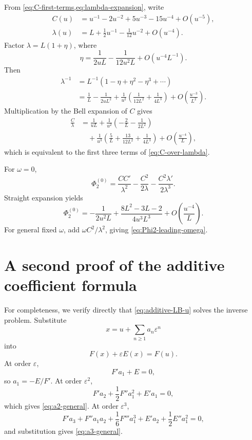 \documentclass[11pt]{article}
\numberwithin{equation}{section}
\theoremstyle{mainthm}
\theoremstyle{defstyle}
\theoremstyle{remark}
\begin{document}
From \cref{eq:C-first-terms,eq:lambda-expansion}, write
\begin{align*}
 C(u)&=u^{-1}-2u^{-2}+5u^{-3}-15u^{-4}+O(u^{-5}),\\
 \lambda(u)&=L+\frac12u^{-1}-\frac1{12}u^{-2}+O(u^{-4}).
\end{align*}
Factor \(\lambda=L(1+\eta)\), where
\[
 \eta=\frac{1}{2uL}-\frac{1}{12u^2L}+O(u^{-4}L^{-1}).
\]
Then
\begin{align*}
 \lambda^{-1}
 &=L^{-1}(1-\eta+\eta^2-\eta^3+\cdots)\\
 &=\frac1L-\frac{1}{2uL^2}
 +\frac1{u^2}\left(\frac{1}{12L^2}+\frac{1}{4L^3}\right)
 +O\!\left(\frac{u^{-3}}{L^2}\right).
\end{align*}
Multiplication by the Bell expansion of \(C\) gives
\begin{align*}
 \frac{C}{\lambda}
 &=\frac1{uL}
 +\frac1{u^2}\left(-\frac2L-\frac1{2L^2}\right)\\
 &\quad+\frac1{u^3}\left(
 \frac5L+\frac{13}{12L^2}+\frac1{4L^3}
 \right)+O\!\left(\frac{u^{-4}}L\right),
\end{align*}
which is equivalent to the first three terms of \cref{eq:C-over-lambda}.

For \(\omega=0\),
\begin{equation}\label{eq:app-Phi2-zero}
 \Phi_2^{(0)}
 =\frac{CC'}{\lambda^2}
 -\frac{C^2}{2\lambda}
 -\frac{C^2\lambda'}{2\lambda^3}.
\end{equation}
Straight expansion yields
\begin{equation}\label{eq:app-Phi2-exp}
 \Phi_2^{(0)}
 =-\frac1{2u^2L}
 +\frac{8L^2-3L-2}{4u^3L^3}
 +O\!\left(\frac{u^{-4}}L\right).
\end{equation}
For general fixed \(\omega\), add \(\omega C^2/\lambda^2\), giving \cref{eq:Phi2-leading-omega}.

\section{A second proof of the additive coefficient formula}\label{app:direct-proof}

For completeness, we verify directly that \cref{eq:additive-LB-u} solves the inverse problem.  Substitute
\[
 x=u+\sum_{n\ge1}a_n\varepsilon^n
\]
into
\[
 F(x)+\varepsilon E(x)=F(u).
\]
At order \(\varepsilon\),
\[
 F'a_1+E=0,
\]
so \(a_1=-E/F'\).  At order \(\varepsilon^2\),
\[
 F'a_2+\frac12F''a_1^2+E'a_1=0,
\]
which gives \cref{eq:a2-general}.  At order \(\varepsilon^3\),
\[
 F'a_3+F''a_1a_2+\frac16F'''a_1^3
 +E'a_2+\frac12E''a_1^2=0,
\]
and substitution gives \cref{eq:a3-general}.
\end{document}
